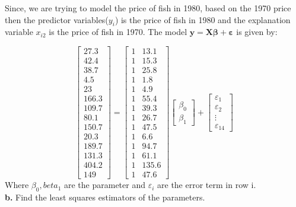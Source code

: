 \documentclass[12 pt, a4paper]{article}
\begin{document}
\noindent Since,  we are trying to model the price of fish in 1980,  based on the 1970 price then the predictor variables($y_i$) is the price of fish in 1980 and the explanation variable $x_{i2}$ is the price of fish in 1970.  The model $\textbf{y}=\textbf{X} \boldsymbol{\beta}+ \boldsymbol{\varepsilon}$ is given by:

\[
\begin{bmatrix}
27.3 \\ 42.4 \\ 38.7 \\ 4.5 \\ 23 \\ 166.3 \\ 109.7 \\ 80.1 \\ 150.7 \\ 20.3 \\ 189.7 \\ 131.3 \\404.2 \\149
\end{bmatrix}=
\begin{bmatrix}
1 & 13.1 \\ 1 & 15.3 \\ 1 & 25.8 \\ 1 & 1.8 \\ 1 & 4.9 \\ 1 & 55.4 \\ 1 & 39.3 \\ 1 & 26.7\\ 1 &  47.5 \\ 1 & 6.6 \\ 1 & 94.7 \\ 1 & 61.1 \\ 1 & 135.6\\ 1 & 47.6
\end{bmatrix}
\begin{bmatrix}
\beta_0 \\ \beta_1
\end{bmatrix} + 
\begin{bmatrix}
\varepsilon_1 \\ \varepsilon_2 \\ \vdots \\ \varepsilon_{14}
\end{bmatrix}
\]
Where $\beta_0, beta_1$ are the parameter and $\varepsilon_i$ are the error term in row i. \\


\noindent \textbf{b.} Find the least squares estimators of the parameters.
\end{document}
